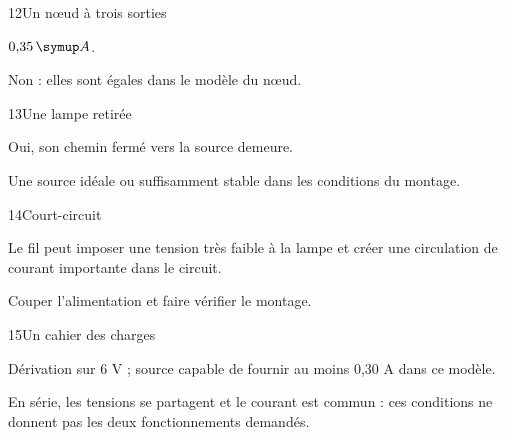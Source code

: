 \par\noindent\begin{minipage}{\linewidth}
\begin{corrige}{12}{Un nœud à trois sorties}
\begin{questions}
\item $0{,}35\unite A$.
\item Non : elles sont égales dans le modèle du nœud.
\end{questions}
\end{corrige}
\end{minipage}
\par\noindent\begin{minipage}{\linewidth}
\begin{corrige}{13}{Une lampe retirée}
\begin{questions}
\item Oui, son chemin fermé vers la source demeure.
\item Une source idéale ou suffisamment stable dans les conditions du montage.
\end{questions}
\end{corrige}
\end{minipage}
\par\noindent\begin{minipage}{\linewidth}
\begin{corrige}{14}{Court-circuit}
\begin{questions}
\item Le fil peut imposer une tension très faible à la lampe et créer une circulation de courant importante dans le circuit.
\item Couper l’alimentation et faire vérifier le montage.
\end{questions}
\end{corrige}
\end{minipage}
\par\noindent\begin{minipage}{\linewidth}
\begin{corrige}{15}{Un cahier des charges}
\begin{questions}
\item Dérivation sur 6 V ; source capable de fournir au moins 0,30 A dans ce modèle.
\item En série, les tensions se partagent et le courant est commun : ces conditions ne donnent pas les deux fonctionnements demandés.
\end{questions}
\end{corrige}
\end{minipage}
